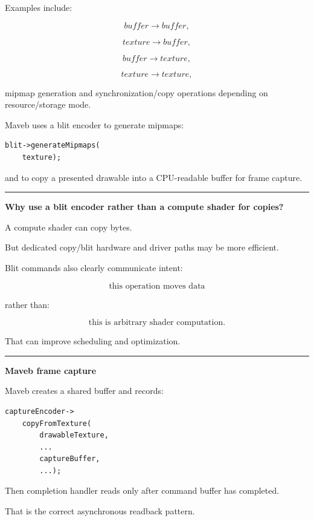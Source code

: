Examples include:

\[
buffer\rightarrow buffer,
\]

\[
texture\rightarrow buffer,
\]

\[
buffer\rightarrow texture,
\]

\[
texture\rightarrow texture,
\]

mipmap generation and synchronization/copy operations depending on resource/storage mode.

Maveb uses a blit encoder to generate mipmaps:

\begin{verbatim}
blit->generateMipmaps(
    texture);
\end{verbatim}

and to copy a presented drawable into a CPU-readable buffer for frame capture.

\begin{center}\rule{0.5\linewidth}{0.5pt}\end{center}

\textbf{Why use a blit encoder rather than a compute shader for copies?}

A compute shader can copy bytes.

But dedicated copy/blit hardware and driver paths may be more efficient.

Blit commands also clearly communicate intent:

\[
\boxed{
\text{this operation moves data}
}
\]

rather than:

\[
\text{this is arbitrary shader computation}.
\]

That can improve scheduling and optimization.

\begin{center}\rule{0.5\linewidth}{0.5pt}\end{center}

\textbf{Maveb frame capture}

Maveb creates a shared buffer and records:

\begin{verbatim}
captureEncoder->
    copyFromTexture(
        drawableTexture,
        ...
        captureBuffer,
        ...);
\end{verbatim}

Then completion handler reads  only after command buffer has completed.

That is the correct asynchronous readback pattern.

